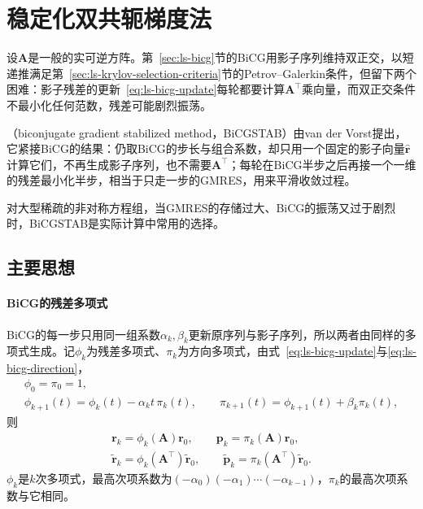 \section{稳定化双共轭梯度法}
\label{sec:ls-bicgstab}

设$\bm A$是一般的实可逆方阵。第~\ref{sec:ls-bicg}节的BiCG用影子序列维持双正交，以短递推满足第~\ref{sec:ls-krylov-selection-criteria}节的Petrov--Galerkin条件，但留下两个困难：影子残差的更新~\eqref{eq:ls-bicg-update}每轮都要计算$\bm A^\top$乘向量，而双正交条件不最小化任何范数，残差可能剧烈振荡。

（biconjugate gradient stabilized method，BiCGSTAB）由van der Vorst提出，它紧接BiCG的结果：仍取BiCG的步长与组合系数，却只用一个固定的影子向量$\widehat{\bm r}$计算它们，不再生成影子序列，也不需要$\bm A^\top$；每轮在BiCG半步之后再接一个一维的残差最小化半步，相当于只走一步的GMRES，用来平滑收敛过程。

对大型稀疏的非对称方程组，当GMRES的存储过大、BiCG的振荡又过于剧烈时，BiCGSTAB是实际计算中常用的选择。

\subsection{主要思想}

\paragraph{BiCG的残差多项式}
BiCG的每一步只用同一组系数$\alpha_k,\beta_k$更新原序列与影子序列，所以两者由同样的多项式生成。记$\phi_k$为残差多项式、$\pi_k$为方向多项式，由式~\eqref{eq:ls-bicg-update}与\eqref{eq:ls-bicg-direction}，
\begin{equation}
 \begin{gathered}
 \phi_0=\pi_0=1,\\
 \phi_{k+1}(t)=\phi_k(t)-\alpha_kt\,\pi_k(t),\qquad
 \pi_{k+1}(t)=\phi_{k+1}(t)+\beta_k\pi_k(t),
 \end{gathered}
 \label{eq:ls-bicgstab-bicg-polynomials}
\end{equation}
则
\begin{equation}
 \begin{gathered}
 \bm r_k=\phi_k(\bm A)\bm r_0,\qquad \bm p_k=\pi_k(\bm A)\bm r_0,\\
 \widetilde{\bm r}_k=\phi_k(\bm A^\top)\widetilde{\bm r}_0,\qquad \widetilde{\bm p}_k=\pi_k(\bm A^\top)\widetilde{\bm r}_0 .
 \end{gathered}
 \label{eq:ls-bicgstab-bicg-representation}
\end{equation}
$\phi_k$是$k$次多项式，最高次项系数为$(-\alpha_0)(-\alpha_1)\cdots(-\alpha_{k-1})$，$\pi_k$的最高次项系数与它相同。

